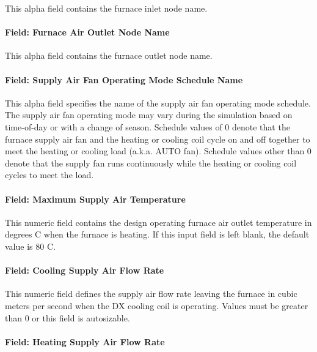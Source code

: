 This alpha field contains the furnace inlet node name.

\paragraph{Field: Furnace Air Outlet Node Name}\label{field-furnace-air-outlet-node-name}

This alpha field contains the furnace outlet node name.

\paragraph{Field: Supply Air Fan Operating Mode Schedule Name}\label{field-supply-air-fan-operating-mode-schedule-name}

This alpha field specifies the name of the supply air fan operating mode schedule. The supply air fan operating mode may vary during the simulation based on time-of-day or with a change of season. Schedule values of 0 denote that the furnace supply air fan and the heating or cooling coil cycle on and off together to meet the heating or cooling load (a.k.a. AUTO fan). Schedule values other than 0 denote that the supply fan runs continuously while the heating or cooling coil cycles to meet the load.

\paragraph{Field: Maximum Supply Air Temperature}\label{field-maximum-supply-air-temperature-1-000}

This numeric field contains the design operating furnace air outlet temperature in degrees C when the furnace is heating. If this input field is left blank, the default value is 80 C.

\paragraph{Field: Cooling Supply Air Flow Rate}\label{field-cooling-supply-air-flow-rate-1-000}

This numeric field defines the supply air flow rate leaving the furnace in cubic meters per second when the DX cooling coil is operating. Values must be greater than 0 or this field is autosizable.

\paragraph{Field: Heating Supply Air Flow Rate}\label{field-heating-supply-air-flow-rate-1-000}

